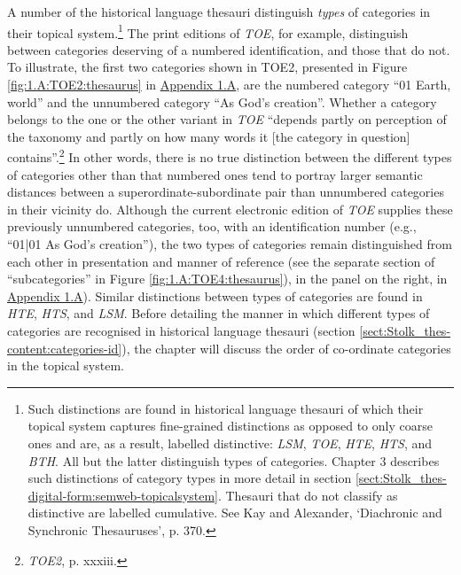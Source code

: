 A number of the historical language thesauri 
distinguish \textit{types} of categories in their topical system.\footnote{Such distinctions are found in historical language thesauri of which their topical system captures fine-grained distinctions as opposed to only coarse ones and are, as a result, labelled distinctive: \textit{LSM}, \textit{TOE}, \textit{HTE}, \textit{HTS}, and \textit{BTH}. All but the latter distinguish types of categories. Chapter 3 describes such distinctions of category types in more detail in section \ref{sect:Stolk_thes-digital-form:semweb-topicalsystem}. Thesauri that do not classify as distinctive are labelled cumulative. See Kay and Alexander, `Diachronic and Synchronic Thesauruses', p. 370.} 
The print editions of \textit{TOE}, for example, distinguish between categories deserving of a numbered identification, and those that do not. To illustrate, the first two categories shown in TOE2, presented in Figure \ref{fig:1.A:TOE2:thesaurus} in \hyperref[Appendix1.A]{Appendix 1.A}, are the numbered category ``01 Earth, world'' and the unnumbered category ``As God's creation''. 
Whether a category belongs to the one or the other variant in \textit{TOE} ``depends partly on perception of the taxonomy and partly on how many words it [the category in question] contains''.\footnote{\textit{TOE2}, p. xxxiii.} In other words, there is no true distinction between the different types of categories other than that numbered ones tend to portray larger semantic distances between a superordinate-subordinate pair than unnumbered categories in their vicinity do. Although the current electronic edition of \textit{TOE} supplies these previously unnumbered categories, too, with an identification number (e.g., ``01|01 As God's creation''), the two types of categories remain distinguished from each other in presentation and manner of reference (see the separate section of ``subcategories'' in Figure \ref{fig:1.A:TOE4:thesaurus}), in the panel on the right, in \hyperref[Appendix1.A]{Appendix 1.A}). Similar distinctions between types of categories are found in \textit{HTE}, \textit{HTS}, and \textit{LSM}. Before detailing the manner in which different types of categories are recognised in historical language thesauri (section \ref{sect:Stolk_thes-content:categories-id}), the chapter will discuss the order of co-ordinate categories in the topical system.


